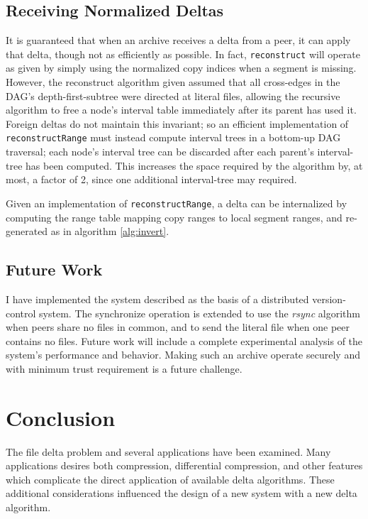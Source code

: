 \documentclass{llncs}
\begin{document}
\subsection{Receiving Normalized Deltas}

It is guaranteed that when an archive receives a delta from a peer, it
can apply that delta, though not as efficiently as possible.  In fact,
\texttt{reconstruct} will operate as given by simply using the
normalized copy indices when a segment is missing.  However, the
reconstruct algorithm given assumed that all cross-edges in the DAG's
depth-first-subtree were directed at literal files, allowing the
recursive algorithm to free a node's interval table immediately after
its parent has used it.  Foreign deltas do not maintain this
invariant; so an efficient implementation of \texttt{reconstructRange}
must instead compute interval trees in a bottom-up DAG traversal; each
node's interval tree can be discarded after each parent's
interval-tree has been computed.  This increases the space required by
the algorithm by, at most, a factor of 2, since one additional
interval-tree may required.

Given an implementation of \texttt{reconstructRange}, a delta can be
internalized by computing the range table mapping copy ranges to local
segment ranges, and re-generated as in algorithm \ref{alg:invert}.

\subsection{Future Work}

I have implemented the system described as the basis of a distributed
version-control system.  The synchronize operation is extended to use
the \emph{rsync} algorithm when peers share no files in common, and to
send the literal file when one peer contains no files.  Future work
will include a complete experimental analysis of the system's
performance and behavior.  Making such an archive operate securely and
with minimum trust requirement is a future challenge.

\section{Conclusion}

The file delta problem and several applications have been examined.
Many applications desires both compression, differential compression,
and other features which complicate the direct application of
available delta algorithms.  These additional considerations
influenced the design of a new system with a new delta algorithm.
\end{document}
